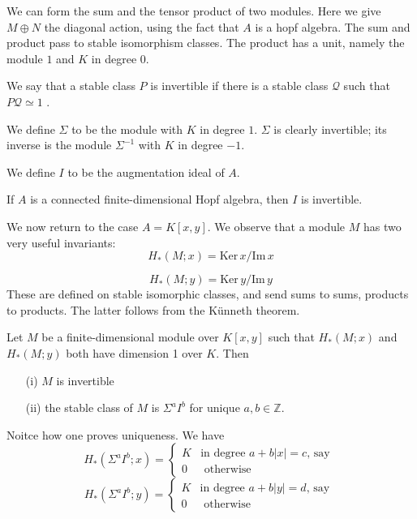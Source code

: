 \documentclass[../main]{subfiles}
\begin{document}
    We can form the sum and the tensor product of two modules. Here we give $M \oplus N$ the diagonal action, using the fact that $A$ is a hopf algebra. The sum and product pass to stable isomorphism classes. The product has a unit, namely the module $1$ and $K$ in degree $0$.
    
    We say that a stable class $P$ is invertible if there is a stable class $\mathcal{Q}$ such that $P\mathcal{Q}\simeq 1$ . 
    
    We define $\Sigma$ to be the module with $K$ in degree $1$. $\Sigma$ is clearly invertible; its inverse is the module $\Sigma^{-1}$ with $K$ in degree $-1$. 
    
    We define $I$ to be the augmentation ideal of $A$.
    
    \begin{lemma} \label{lem:p3ch16.2}
     If $A$ is a connected finite-dimensional Hopf algebra, then $I$ is invertible. 
    \end{lemma}
    We now return to the case $A=K[x, y]$. We observe that a module $M$ has two very useful invariants:
    \[ H_{\ast}(M;x)= \mathrm{Ker} \, x/\mathrm{Im} \, x \]
    
    \[ H_{\ast}(M;y)= \mathrm{Ker} \, y/\mathrm{Im} \, y \]
    These are defined on stable isomorphic classes, and send sums to sums, products to products. The latter follows from the Künneth theorem. 
    
    \begin{theorem}\label{thm:p3ch16.3}
    Let $M$ be a finite-dimensional module over $K[x, y]$ such that $H_{\ast}(M;x)$ and $H_{\ast}(M;y)$ both have dimension 1 over $K$. Then
    \begin{enumerate}
        \item[(i)] $M$ is invertible
        \item[(ii)] the stable class of $M$ is $\Sigma^{a}I^{b}$ for unique $a, b\in \mathbb Z$. 
    \end{enumerate}
    \end{theorem}
    Noitce how one proves uniqueness. We have
    \[ H_{\ast}(\Sigma^{a}I^{b};x)= \begin{cases}
        K &\text{in degree $a+b|x|=c$, say } \\
        0 &\text{ otherwise}
    \end{cases} \]
    \[ H_{\ast}(\Sigma^{a}I^{b};y)= \begin{cases}
        K &\text{in degree $a+b|y|=d$, say } \\
        0 &\text{ otherwise}
    \end{cases} \]
    
\end{document}
